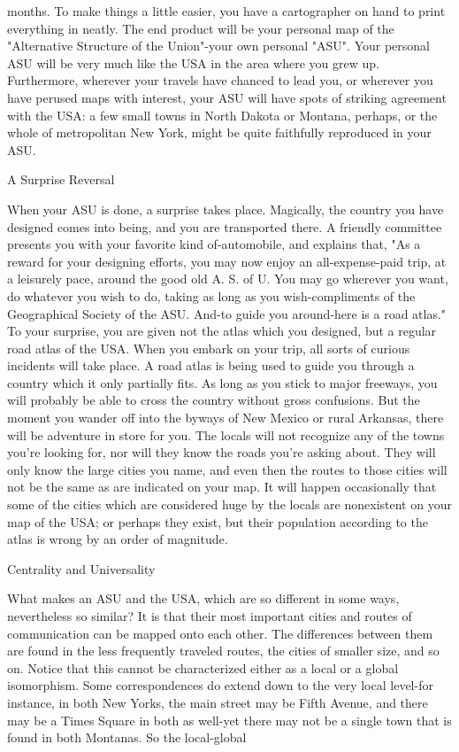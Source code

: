 months. To make things a little easier, you have a cartographer on hand to print
everything in neatly. The end product will be your personal map of the "Alternative
Structure of the Union"-your own personal "ASU".
       Your personal ASU will be very much like the USA in the area where you grew
up. Furthermore, wherever your travels have chanced to lead you, or wherever you have
perused maps with interest, your ASU will have spots of striking agreement with the
USA: a few small towns in North Dakota or Montana, perhaps, or the whole of
metropolitan New York, might be quite faithfully reproduced in your ASU.

                                   A Surprise Reversal

When your ASU is done, a surprise takes place. Magically, the country you have
designed comes into being, and you are transported there. A friendly committee presents
you with your favorite kind of-automobile, and explains that, "As a reward for your
designing efforts, you may now enjoy an all-expense-paid trip, at a leisurely pace, around
the good old A. S. of U. You may go wherever you want, do whatever you wish to do,
taking as long as you wish-compliments of the Geographical Society of the ASU. And-to
guide you around-here is a road atlas." To your surprise, you are given not the atlas
which you designed, but a regular road atlas of the USA.
        When you embark on your trip, all sorts of curious incidents will take place. A
road atlas is being used to guide you through a country which it only partially fits. As
long as you stick to major freeways, you will probably be able to cross the country
without gross confusions. But the moment you wander off into the byways of New
Mexico or rural Arkansas, there will be adventure in store for you. The locals will not
recognize any of the towns you're looking for, nor will they know the roads you're asking
about. They will only know the large cities you name, and even then the routes to those
cities will not be the same as are indicated on your map. It will happen occasionally that
some of the cities which are considered huge by the locals are nonexistent on your map of
the USA; or perhaps they exist, but their population according to the atlas is wrong by an
order of magnitude.

                               Centrality and Universality

What makes an ASU and the USA, which are so different in some ways, nevertheless so
similar? It is that their most important cities and routes of communication can be mapped
onto each other. The differences between them are found in the less frequently traveled
routes, the cities of smaller size, and so on. Notice that this cannot be characterized either
as a local or a global isomorphism. Some correspondences do extend down to the very
local level-for instance, in both New Yorks, the main street may be Fifth Avenue, and
there may be a Times Square in both as well-yet there may not be a single town that is
found in both Montanas. So the local-global





